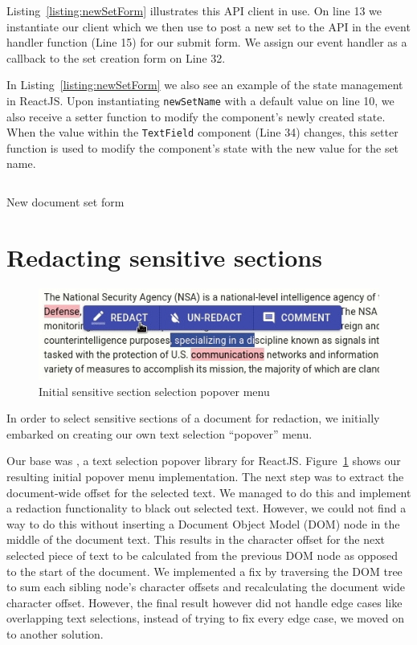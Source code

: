 \documentclass[\version]{l4proj}
\begin{document}
Listing~\ref{listing:newSetForm} illustrates this API client in use.
On line 13 we instantiate our client which we then use to post a new set to the API in the event handler function (Line 15) for our submit form.
We assign our event handler as a callback to the set creation form on Line 32.

In Listing~\ref{listing:newSetForm} we also see an example of the state management in ReactJS.
Upon instantiating \verb|newSetName| with a default value on line 10, we also receive a setter function to modify the component's newly created state.
When the value within the \verb|TextField| component (Line 34) changes, this setter function is used to modify the component's state with the new value for the set name.

\begin{listing}[H]
    \inputminted{jsx}{code/newSetForm.jsx}
    \caption{New document set form}\label{listing:newSetForm}
\end{listing}

\section{Redacting sensitive sections}

\begin{figure}
    \includegraphics[width=\linewidth]{images/popover_menu_1.jpg}
    \caption{Initial sensitive section selection popover menu}\label{fig:popover_1}
    \vspace{-10pt}
\end{figure}

In order to select sensitive sections of a document for redaction, we initially embarked on creating our own text selection ``popover'' menu.

Our base was \textcite{krispel-samselJuliankrispelReacttextselectionpopover2020}, a text selection popover library for ReactJS.
Figure~\ref{fig:popover_1} shows our resulting initial popover menu implementation.
The next step was to extract the document-wide offset for the selected text.
We managed to do this and implement a redaction functionality to black out selected text.
However, we could not find a way to do this without inserting a Document Object Model (DOM) node in the middle of the document text.
This results in the character offset for the next selected piece of text to be calculated from the previous DOM node as opposed to the start of the document.
We implemented a fix by traversing the DOM tree to sum each sibling node's character offsets and recalculating the document wide character offset.
However, the final result however did not handle edge cases like overlapping text selections, instead of trying to fix every edge case, we moved on to another solution.
\end{document}

